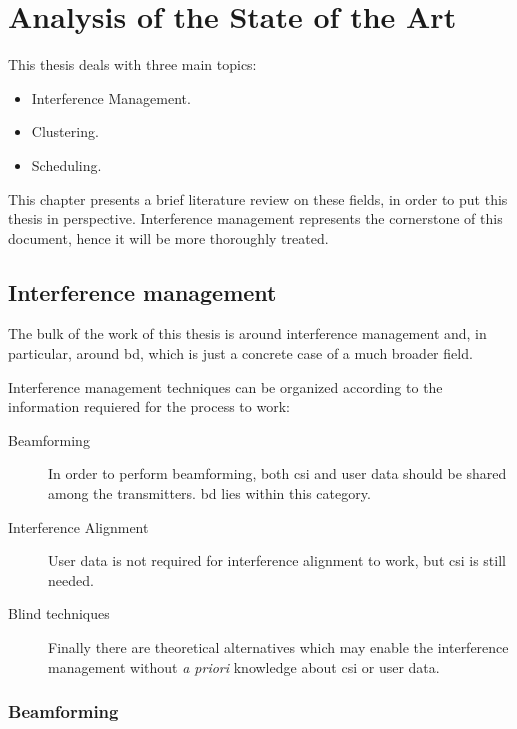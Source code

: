 \chapter{Analysis of the State of the Art}\label{ch:state_art}

This thesis deals with three main topics:

\begin{itemize}
   \item Interference Management.
   \item Clustering.
   \item Scheduling.
\end{itemize}

This chapter presents a brief literature review on these fields, in order to put
this thesis in perspective. Interference management represents the cornerstone
of this document, hence it will be more thoroughly treated.

\section{Interference management} \label{sec:sa_interf}

The bulk of the work of this thesis is around interference management and, in
particular, around \gls{bd}, which is just a concrete case of a much broader
field.

Interference management techniques can be organized according to the information
requiered for the process to work:

\begin{description}
    \item[Beamforming] In order to perform beamforming, both \gls{csi} and user
        data should be shared among the transmitters. \gls{bd} lies within this
        category.
    \item[Interference Alignment] User data is not required for interference
        alignment to work, but \gls{csi} is still needed.
    \item[Blind techniques] Finally there are theoretical alternatives which may
        enable the interference management without \emph{a priori} knowledge
        about \gls{csi} or user data.
\end{description}

\subsection{Beamforming} \label{ssec:sa_bf}

